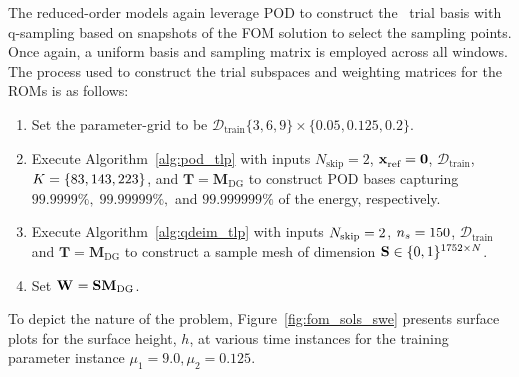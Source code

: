 The reduced-order models again leverage POD to construct the \spatialAcronym\ trial basis with q-sampling based on snapshots of the FOM solution to select the sampling points. Once again, a uniform basis and sampling matrix is employed across all windows. The process used to construct the trial subspaces and weighting matrices for the ROMs is as follows:
\begin{enumerate}
\item Set the parameter-grid to be $\mathcal{D}_{\text{train}}  \{ 3,6,9 \} \times \{0.05,0.125,0.2\}$. 
\item Execute Algorithm~\ref{alg:pod_tlp} with inputs $N_{\text{skip}} = 2$, $\mathbf{x}_\text{ref}^{} = \boldsymbol 0$, $\mathcal{D}_{\text{train}}$, $K = \{ 83,143 ,223 \}$, and $\mathbf{T} = \mathbf{M}_{\text{DG}}$ to construct POD bases capturing $99.9999\%, \; 99.99999\%,$ and $99.999999\%$ of the energy, respectively.
\item Execute Algorithm~\ref{alg:qdeim_tlp} with inputs $N_{\text{skip}} = 2$, $n_s = 150$, $\mathcal{D}_{\text{train}}$ and $\mathbf{T} = \mathbf{M}_{\text{DG}}$ to construct a sample mesh of dimension $\mathbf{S} \in \{0,1\}^{1752\times N }$.
 \item Set $\mathbf{W}^{} = \mathbf{S} \mathbf{M}_{\text{DG}}$. 
\end{enumerate}  
To depict the nature of the problem, Figure~\ref{fig:fom_sols_swe} presents surface plots for the surface height, $h$, at various time instances for the training parameter instance $\mu_1 = 9.0,\mu_2 = 0.125$.
